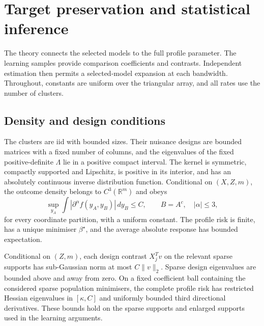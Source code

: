 \section{Target preservation and statistical inference}\label{sec:theory}

The theory connects the selected models to the full profile parameter.
The learning samples provide comparison coefficients and contrasts.
Independent estimation then permits a selected-model expansion at
each bandwidth. Throughout, constants are uniform over the triangular
array, and all rates use the number of clusters.

\subsection{Density and design conditions}\label{subsec:assumptions}

\begin{assumption}\label{ass:clusters}
The clusters are iid with bounded sizes. Their nuisance designs are
bounded matrices with a fixed number of columns, and the eigenvalues
of the fixed positive-definite $\Lambda$ lie in a positive compact
interval. The kernel is symmetric, compactly
supported and Lipschitz, is positive in its interior, and has an
absolutely continuous inverse distribution function. Conditional on
$(X,Z,m)$, the outcome density belongs to $C^3(\mathbb R^m)$ and obeys
\begin{equation}\label{eq:density-section}
 \sup_{y_A}\int |\partial^\alpha f(y_A,y_B)|\,dy_B\leq C,
 \qquad B=A^c,\quad |\alpha|\leq3,
\end{equation}
for every coordinate partition, with a uniform constant. The profile
risk is finite, has a unique minimiser $\beta^\star$, and the average
absolute response has bounded expectation.
\end{assumption}

\begin{assumption}\label{ass:design}
Conditional on $(Z,m)$, each design contrast $X_j^Tv$ on the relevant
sparse supports has sub-Gaussian norm at most $C\|v\|_2$.
Sparse design eigenvalues are bounded above
and away from zero. On a fixed coefficient ball containing the
considered sparse population minimisers, the complete profile risk has
restricted Hessian eigenvalues in $[\kappa,C]$ and uniformly bounded
third directional derivatives. These bounds hold on the sparse
supports and enlarged supports used in the learning arguments.
\end{assumption}

